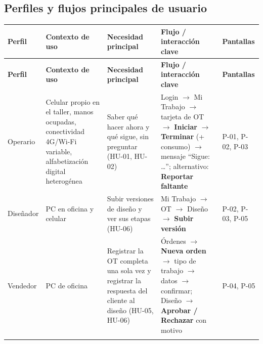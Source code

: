 \documentclass[11pt,a4paper]{article}
\begin{document}
\subsection{Perfiles y flujos principales de usuario}

\begingroup\small
\begin{longtable}{@{}>{\raggedright\arraybackslash\hspace{0pt}}p{}>{\raggedright\arraybackslash\hspace{0pt}}p{}>{\raggedright\arraybackslash\hspace{0pt}}p{}>{\raggedright\arraybackslash\hspace{0pt}}p{}>{\raggedright\arraybackslash\hspace{0pt}}p{}@{}}
\toprule
\textbf{Perfil} & \textbf{Contexto de uso} & \textbf{Necesidad principal} & \textbf{Flujo / interacción clave} & \textbf{Pantallas} \\ \midrule
\endfirsthead
\toprule
\textbf{Perfil} & \textbf{Contexto de uso} & \textbf{Necesidad principal} & \textbf{Flujo / interacción clave} & \textbf{Pantallas} \\ \midrule
\endhead
\bottomrule
\endlastfoot
\mbox{Operario} & Celular propio en el taller, manos ocupadas, conectividad 4G/Wi-Fi variable, alfabetización digital heterogénea & Saber qué hacer ahora y qué sigue, sin preguntar (\mbox{HU-01}, \mbox{HU-02}) & Login \ensuremath{\rightarrow}\allowbreak{} Mi Trabajo \ensuremath{\rightarrow}\allowbreak{} tarjeta de OT \ensuremath{\rightarrow}\allowbreak{} \textbf{Iniciar} \ensuremath{\rightarrow}\allowbreak{} \textbf{Terminar} (+ consumo) \ensuremath{\rightarrow}\allowbreak{} mensaje ``Sigue: \ldots{}''; alternativo: \textbf{Reportar faltante} & \mbox{P-01}, \mbox{P-02}, \mbox{P-03} \\ \addlinespace[0.25em]
Diseñador & PC en oficina y celular & Subir versiones de diseño y ver sus etapas (\mbox{HU-06}) & Mi Trabajo \ensuremath{\rightarrow}\allowbreak{} OT \ensuremath{\rightarrow}\allowbreak{} Diseño \ensuremath{\rightarrow}\allowbreak{} \textbf{Subir versión} & \mbox{P-02}, \mbox{P-03}, \mbox{P-05} \\ \addlinespace[0.25em]
\mbox{Vendedor} & PC de oficina & Registrar la OT completa una sola vez y registrar la respuesta del cliente al diseño (\mbox{HU-05}, \mbox{HU-06}) & Órdenes \ensuremath{\rightarrow}\allowbreak{} \textbf{Nueva orden} \ensuremath{\rightarrow}\allowbreak{} tipo de trabajo \ensuremath{\rightarrow}\allowbreak{} datos \ensuremath{\rightarrow}\allowbreak{} confirmar; Diseño \ensuremath{\rightarrow}\allowbreak{} \textbf{Aprobar / Rechazar} con motivo & \mbox{P-04}, \mbox{P-05} \\ \addlinespace[0.25em]

\end{longtable}
\end{document}
